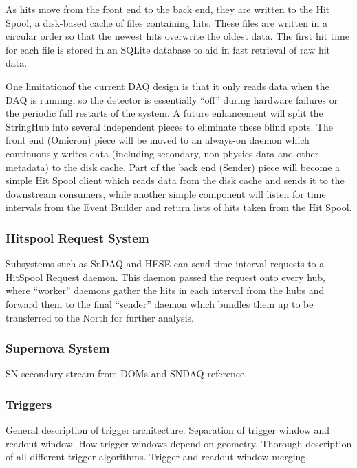 As hits move from the front end to the back end, they are written to the
Hit Spool, a disk-based cache of files containing hits.  These files are
written in a circular order so that the newest hits overwrite the oldest data.
The first hit time for each file is stored in an SQLite database to aid in fast
retrieval of raw hit data.

One limitationof the current DAQ design is that it only reads data when the
DAQ is running, so the detector is essentially ``off'' during hardware failures
or the periodic full restarts of the system.  A future enhancement will split
the StringHub into several independent pieces to eliminate these blind spots.
The front end (Omicron) piece will be moved to an always-on daemon which
continuously writes data (including secondary, non-physics data and other
metadata) to the disk cache.  Part of the back end (Sender) piece will become a
simple Hit Spool client which reads data from the disk cache and sends it to
the downstream consumers, while another simple component will listen for time
intervals from the Event Builder and return lists of hits taken from the
Hit Spool.

\subsubsection{Hitspool Request System}

Subsystems such as SnDAQ and HESE can send time interval requests to a HitSpool
Request daemon. This daemon passed the request onto every hub,
where ``worker'' daemons gather the hits in each interval from the hubs
and forward them to the
final ``sender'' daemon which bundles them up to be transferred to the
North
for further analysis.

\subsubsection{Supernova System}

SN secondary stream from DOMs and SNDAQ reference.

\subsubsection{Triggers}

General description of trigger architecture.  Separation of trigger window
and readout window.  How trigger windows depend on geometry.  Thorough
description of all different trigger algorithms. Trigger and readout window
merging.


